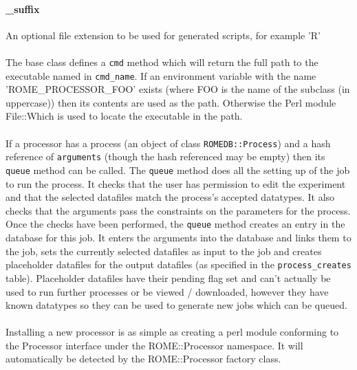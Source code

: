 \paragraph{\_suffix}
An optional file extension to be used for generated scripts, for example 'R'

\paragraph{}
The base class defines a \texttt{cmd} method which will return the full path to the executable named in \texttt{cmd\_name}. If an environment variable with the name 'ROME\_PROCESSOR\_FOO' exists (where FOO is the name of the subclass (in uppercase)) then its contents are used as the path. Otherwise the Perl module File::Which is used to locate the executable in the path. 

\paragraph{}
If a processor has a process (an object of class \texttt{ROMEDB::Process}) and a hash reference of \texttt{arguments} (though the hash referenced may be empty) then its \texttt{queue} method can be called. The \texttt{queue} method does all the setting up of the job to run the process. It checks that the user has permission to edit the experiment and that the selected datafiles match the process's accepted datatypes. It also checks that the arguments pass the constraints on the parameters for the process. Once the checks have been performed, the \texttt{queue} method creates an entry in the database for this job. It enters the arguments into the database and links them to the job, sets the currently selected datafiles as input to the job and creates placeholder datafiles for the output datafiles (as specified in the \texttt{process\_creates} table). Placeholder datafiles have their pending flag set and can't actually be used to run further processes or be viewed / downloaded,  however they have known datatypes so they can be used to generate new jobs which can be queued.


\paragraph{}
Installing a new processor is as simple as creating a perl module conforming to the Processor interface under the ROME::Processor namespace. It will automatically be detected by the ROME::Processor factory class.







